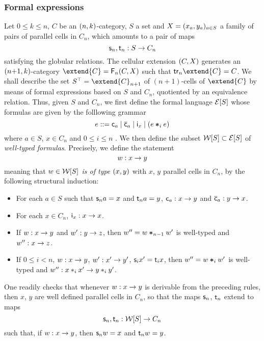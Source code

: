 \subsubsection{Formal expressions}\label{ssubsec:formex}
Let $0\leq k\leq n$, $C$ be an $(n,k)$-category, $S$ a set and $X=(x_a,y_a)_{a\in S}$
a family of pairs of parallel cells in $C_n$, which amounts to a pair
of maps
\[\mathsf{s}_{n},\mathsf{t}_{n}:S\to C_n\]
satisfying the globular relations. The cellular extension
$(C,X)$ generates an $(n{+}1,k)$-category $\extend{C}=\frf n\pair
CX$ such that $\trk n \extend{C}=C$. We shall describe the set $\frgp S=\extend{C}_{n+1}$ of
$(n{+}1)$-cells of $\extend{C}$ by means of formal expressions
based on $S$ and $C_n$, quotiented by an equivalence relation. Thus,
given $S$ and $C_n$, we first define the formal language $\mathcal{E}[S]$
whose formulas are given by the folllowing grammar
\[
  e ::= \mathsf{c}_{a} \mid \overline{\mathsf{c}}_{a} \mid \mathsf{i}_{x} \mid (e\bm{\ast}_{i} e)
\]
where $a\in S$, $x\in C_n$ and $0\leq i\leq n$ . We then define the
subset  $\mathcal{W}[S]\subset\mathcal{E}[S]$ of {\em well-typed formulas}.
Precisely, we define the statement
\[w:x\to y\]
meaning that {\em $w\in\mathcal{W}[S]$ is of type $(x,y)$} with $x$, $y$ parallel
cells in $C_n$, by the following structural induction:
\begin{itemize}
\item For each $a\in S$ such that $\mathsf{s}_{n} a=x$ and $\mathsf{t}_{n} a=y$,
  $\mathsf{c}_{a}:x\to y$
  and $\overline{\mathsf{c}}_{a}:y\to x$.
\item For  each $x\in C_n$, $\mathsf{i}_{x}:x\to x$.
 \item If $w:x\to y$ and $w':y\to z$, then $w''=w\bm{\ast}_{n-1}w'$ is
   well-typed and $w'':x\to z$.
 \item If $0\leq i<n$, $w:x\to y$, $w':x'\to y'$, $\mathsf{s}_{i}{x'}=\mathsf{t}_{i}{x}$, then $w''=w\bm{\ast}_{i} w'$ is well-typed and
   $w'':x\ast_{i} x'\to y\ast_{i} y'$. 
 \end{itemize}
 One readily checks that whenever $w:x\to y$ is derivable from the
 preceding rules, then $x$, $y$ are well defined parallel cells in
 $C_n$, so that the maps $\mathsf{s}_{n}$, $\mathsf{t}_{n}$ extend to maps
 \[\mathsf{s}_{n}, \mathsf{t}_{n} :\mathcal{W}[S]\to C_n\]
 such that, if $w:x\to y$,  then $\mathsf{s}_{n} w=x$ and $\mathsf{t}_{n} w=y$.

